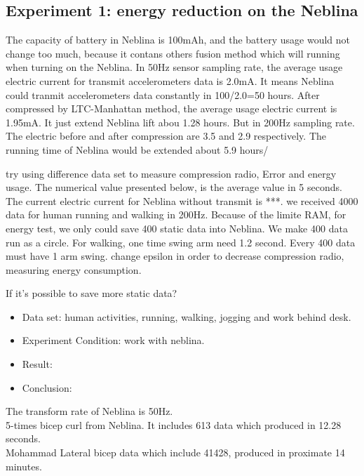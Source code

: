 \documentclass[10pt, conference, compsocconf]{IEEEtran}
\newcommand{\todo}[1]{\marginpar{\parbox{18mm}{\flushleft\tiny\color{red}\textbf{TODO}:
      #1}}}
\begin{document}
\subsection{Experiment 1: energy reduction on the Neblina}

The capacity of battery in Neblina is 100mAh, and the battery usage would not change too much, because it contans others fusion method which will running when turning on the Neblina.
In 50Hz sensor sampling rate, the average usage electric current for transmit accelerometers data is 2.0mA. It means Neblina could tranmit accelerometers data constantly in 100/2.0=50 hours.
After compressed by LTC-Manhattan method, the average usage electric current is 1.95mA. It just extend Neblina lift abou 1.28 hours.
But in 200Hz sampling rate. The electric before and after compression are 3.5 and 2.9 respectively. The running time of Neblina would be extended about 5.9 hours/


\todo{ update }
try using difference data set to measure compression radio, Error 
and energy usage. The numerical value presented below, is the 
average value in 5 seconds. The current electric current for Neblina 
without transmit is ***. we received 4000 data for human running and 
walking in 200Hz. Because of the limite RAM, for energy test, we only
could save 400 static data into Neblina. We make 400 data run as a circle.
For walking, one time swing arm need 1.2 second. Every 400 data must have 1 arm swing.
change epsilon in order to decrease compression radio, measuring energy consumption.

\todo {running}
If it's possible to save more static data?



\begin{itemize}
    \item Data set: human activities, running, walking, jogging and work behind desk.
    \item Experiment Condition: work with neblina.
    \item Result:
    \item Conclusion:
\end{itemize}



The transform rate of Neblina is 50Hz.
\\
5-times bicep curl from Neblina. It includes 613 data which produced in 12.28 seconds.
\\
Mohammad Lateral bicep data which include 41428, produced in proximate 14 minutes.
\end{document}
